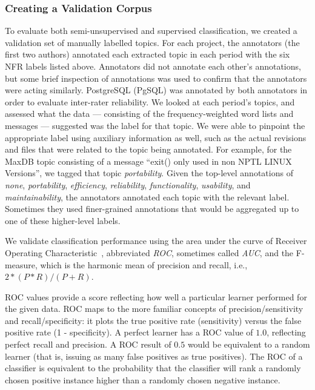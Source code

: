\documentclass[smallextended]{svjour3}       %
\begin{document}
\subsubsection{Creating a Validation Corpus}
To evaluate both semi-unsupervised and supervised classification, we
created a validation set of manually labelled topics. For each project,
 the annotators (the first two authors) annotated each extracted topic in each period with
the six NFR labels listed above.
Annotators did not annotate each other's annotations, but some brief
inspection of annotations was used to confirm that the annotators were
acting similarly. PostgreSQL (PgSQL) was annotated by both annotators in order
to evaluate inter-rater reliability.
We looked at each period's topics, and assessed what the data ---
consisting of the frequency-weighted word lists and messages ---
suggested was the label for that topic. 
We were able to pinpoint the appropriate label using auxiliary information as well, such as the actual revisions and files that were related to the
topic being annotated.
For example, for the MaxDB topic consisting of a message ``exit() only
used in non NPTL LINUX Versions'', we tagged that topic
\emph{portability}. 
Given the top-level annotations of \emph{none}, \emph{portability},
\emph{efficiency}, \emph{reliability}, \emph{functionality},
\emph{usability}, and \emph{maintainability}, the annotators annotated each topic
with the relevant label. Sometimes they used finer-grained
annotations that would be aggregated up to one of these higher-level labels.

We validate classification performance using the area under the curve
of Receiver Operating
Characteristic~\cite{Fawcett2006861},
abbreviated \emph{ROC}, sometimes called \emph{AUC}, and the F-measure, which is the harmonic mean of precision and recall, i.e., $2 * (P * R) / (P + R)$. 

ROC values provide a score %
 reflecting how well a particular learner performed for the given data. 
ROC maps to the more familiar concepts of precision/sensitivity and recall/specificity: it plots the true positive rate (sensitivity) versus the false
positive rate (1 - specificity). 
A perfect learner has a ROC value of $1.0$, reflecting perfect recall and precision. 
A ROC result of $0.5$ would be equivalent to a random learner (that is, issuing as many false positives as true positives). 
The %
ROC of a classifier is equivalent to the probability that the classifier will rank a randomly chosen positive instance higher than a randomly chosen
negative instance.
\end{document}
